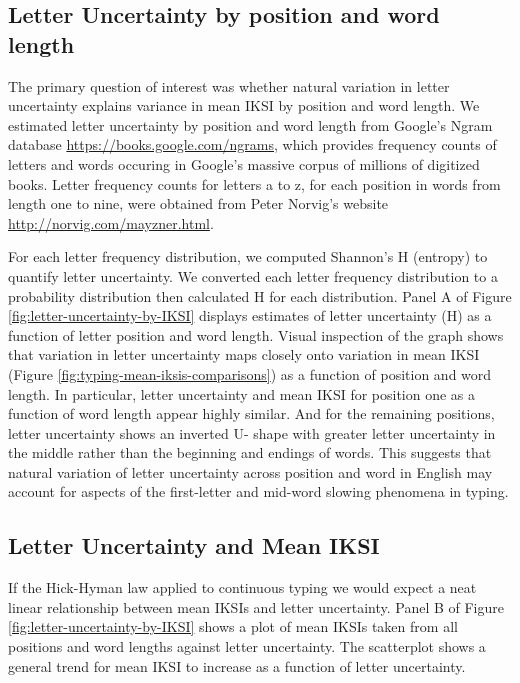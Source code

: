\documentclass[floatsintext,man]{apa6}
\theoremstyle{definition}
\theoremstyle{definition}
\theoremstyle{definition}
\theoremstyle{remark}
\begin{document}
\subsection{Letter Uncertainty by position and word
length}\label{letter-uncertainty-by-position-and-word-length}

The primary question of interest was whether natural variation in letter
uncertainty explains variance in mean IKSI by position and word length.
We estimated letter uncertainty by position and word length from
Google's Ngram database \url{https://books.google.com/ngrams}, which
provides frequency counts of letters and words occuring in Google's
massive corpus of millions of digitized books. Letter frequency counts
for letters a to z, for each position in words from length one to nine,
were obtained from Peter Norvig's website
\url{http://norvig.com/mayzner.html}.

For each letter frequency distribution, we computed Shannon's H
(entropy) to quantify letter uncertainty. We converted each letter
frequency distribution to a probability distribution then calculated H
for each distribution. Panel A of Figure
\ref{fig:letter-uncertainty-by-IKSI} displays estimates of letter
uncertainty (H) as a function of letter position and word length. Visual
inspection of the graph shows that variation in letter uncertainty maps
closely onto variation in mean IKSI (Figure
\ref{fig:typing-mean-iksis-comparisons}) as a function of position and
word length. In particular, letter uncertainty and mean IKSI for
position one as a function of word length appear highly similar. And for
the remaining positions, letter uncertainty shows an inverted U- shape
with greater letter uncertainty in the middle rather than the beginning
and endings of words. This suggests that natural variation of letter
uncertainty across position and word in English may account for aspects
of the first-letter and mid-word slowing phenomena in typing.

\subsection{Letter Uncertainty and Mean
IKSI}\label{letter-uncertainty-and-mean-iksi}

If the Hick-Hyman law applied to continuous typing we would expect a
neat linear relationship between mean IKSIs and letter uncertainty.
Panel B of Figure \ref{fig:letter-uncertainty-by-IKSI} shows a plot of
mean IKSIs taken from all positions and word lengths against letter
uncertainty. The scatterplot shows a general trend for mean IKSI to
increase as a function of letter uncertainty.
\end{document}
